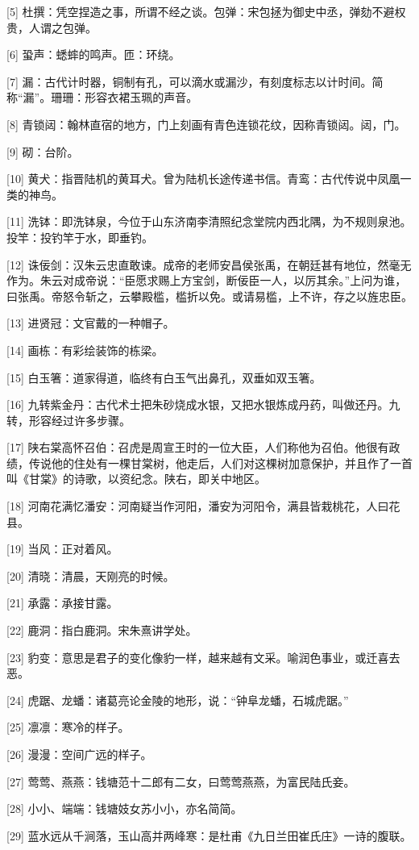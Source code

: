 \documentclass[12pt,UTF8]{ctexbook}
\begin{document}
[5] 杜撰：凭空捏造之事，所谓不经之谈。包弹：宋包拯为御史中丞，弹劾不避权贵，人谓之包弹。

[6] 蛩声：蟋蟀的鸣声。匝：环绕。

[7] 漏：古代计时器，铜制有孔，可以滴水或漏沙，有刻度标志以计时间。简称“漏”。珊珊：形容衣裙玉珮的声音。

[8] 青锁闼：翰林直宿的地方，门上刻画有青色连锁花纹，因称青锁闼。闼，门。

[9] 砌：台阶。

[10] 黄犬：指晋陆机的黄耳犬。曾为陆机长途传递书信。青鸾：古代传说中凤凰一类的神鸟。

[11] 洗钵：即洗钵泉，今位于山东济南李清照纪念堂院内西北隅，为不规则泉池。投竿：投钓竿于水，即垂钓。

[12] 诛佞剑：汉朱云忠直敢谏。成帝的老师安昌侯张禹，在朝廷甚有地位，然毫无作为。朱云对成帝说：“臣愿求赐上方宝剑，断佞臣一人，以厉其余。”上问为谁，曰张禹。帝怒令斩之，云攀殿槛，槛折以免。或请易槛，上不许，存之以旌忠臣。

[13] 进贤冠：文官戴的一种帽子。

[14] 画栋：有彩绘装饰的栋梁。

[15] 白玉箸：道家得道，临终有白玉气出鼻孔，双垂如双玉箸。

[16] 九转紫金丹：古代术士把朱砂烧成水银，又把水银炼成丹药，叫做还丹。九转，形容经过许多步骤。

[17] 陕右棠高怀召伯：召虎是周宣王时的一位大臣，人们称他为召伯。他很有政绩，传说他的住处有一棵甘棠树，他走后，人们对这棵树加意保护，并且作了一首叫《甘棠》的诗歌，以资纪念。陕右，即关中地区。

[18] 河南花满忆潘安：河南疑当作河阳，潘安为河阳令，满县皆栽桃花，人曰花县。

[19] 当风：正对着风。

[20] 清晓：清晨，天刚亮的时候。

[21] 承露：承接甘露。

[22] 鹿洞：指白鹿洞。宋朱熹讲学处。

[23] 豹变：意思是君子的变化像豹一样，越来越有文采。喻润色事业，或迁喜去恶。

[24] 虎踞、龙蟠：诸葛亮论金陵的地形，说：“钟阜龙蟠，石城虎踞。”

[25] 凛凛：寒冷的样子。

[26] 漫漫：空间广远的样子。

[27] 莺莺、燕燕：钱塘范十二郎有二女，曰莺莺燕燕，为富民陆氏妾。

[28] 小小、端端：钱塘妓女苏小小，亦名简简。

[29] 蓝水远从千涧落，玉山高并两峰寒：是杜甫《九日兰田崔氏庄》一诗的腹联。
\end{document}
